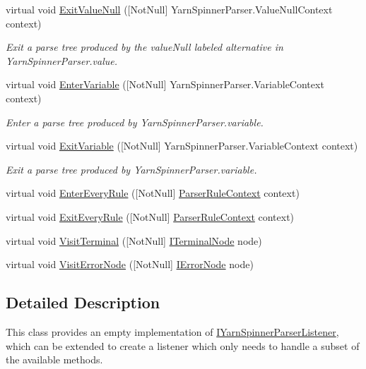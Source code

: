 \begin{DoxyCompactItemize}
virtual void \hyperlink{a00190_a518cf1ada7b47f37d83e38c2abcc759d}{Exit\-Value\-Null} (\mbox{[}Not\-Null\mbox{]} Yarn\-Spinner\-Parser.\-Value\-Null\-Context context)
\begin{DoxyCompactList}\small\item\em Exit a parse tree produced by the {\ttfamily value\-Null} labeled alternative in Yarn\-Spinner\-Parser.\-value. \end{DoxyCompactList}\item 
virtual void \hyperlink{a00190_afaa8a2993d94e0e4460a69ef516e5849}{Enter\-Variable} (\mbox{[}Not\-Null\mbox{]} Yarn\-Spinner\-Parser.\-Variable\-Context context)
\begin{DoxyCompactList}\small\item\em Enter a parse tree produced by Yarn\-Spinner\-Parser.\-variable. \end{DoxyCompactList}\item 
virtual void \hyperlink{a00190_a2f4cf38483d1c434b0e0225b950f7a66}{Exit\-Variable} (\mbox{[}Not\-Null\mbox{]} Yarn\-Spinner\-Parser.\-Variable\-Context context)
\begin{DoxyCompactList}\small\item\em Exit a parse tree produced by Yarn\-Spinner\-Parser.\-variable. \end{DoxyCompactList}\item 
virtual void \hyperlink{a00190_a891c4119d1a34f4b7fa3994a8ab63188}{Enter\-Every\-Rule} (\mbox{[}Not\-Null\mbox{]} \hyperlink{a00307_a7e45f8222713cb764832fd3c69d0268f}{Parser\-Rule\-Context} context)
\item 
virtual void \hyperlink{a00190_adb4bf06fefa70949d705cf1fc4f9eafe}{Exit\-Every\-Rule} (\mbox{[}Not\-Null\mbox{]} \hyperlink{a00307_a7e45f8222713cb764832fd3c69d0268f}{Parser\-Rule\-Context} context)
\item 
virtual void \hyperlink{a00190_aa1dfd73e68ddef6754237fb33984fcf4}{Visit\-Terminal} (\mbox{[}Not\-Null\mbox{]} \hyperlink{a00307_a72f9ef657b5686a84acec94a9d7302d1}{I\-Terminal\-Node} node)
\item 
virtual void \hyperlink{a00190_a23c6fe6f098193795ac42544600dbb1a}{Visit\-Error\-Node} (\mbox{[}Not\-Null\mbox{]} \hyperlink{a00307_af5d51a3c18761c8348444279f29c7007}{I\-Error\-Node} node)
\end{DoxyCompactItemize}


\subsection{Detailed Description}
This class provides an empty implementation of \hyperlink{a00118}{I\-Yarn\-Spinner\-Parser\-Listener}, which can be extended to create a listener which only needs to handle a subset of the available methods. 



